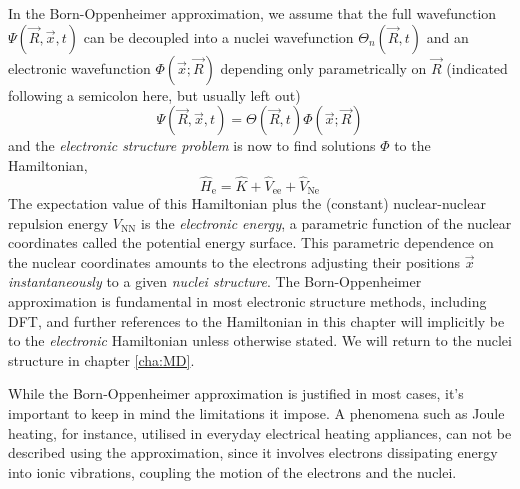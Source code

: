 \documentclass[11pt,bibliography=totoc,index=totoc]{scrbook}   %
\begin{document}


In the Born-Oppenheimer approximation, we assume that the full wavefunction $\Psi(\vec{R},\vec{x},t)$ can be decoupled into 
a nuclei wavefunction $\Theta_n(\vec{R},t)$ and an electronic wavefunction $\Phi(\vec{x};\vec{R})$ depending only parametrically on $\vec{R}$
(indicated following a semicolon here, but usually left out)
\begin{equation}
  \Psi(\vec{R},\vec{x},t) = \Theta(\vec{R},t)\Phi(\vec{x};\vec{R})
\end{equation}
and the \emph{electronic structure problem} is now to find solutions $\Phi$ to the Hamiltonian,
\begin{equation}
    \hat{H}_{\text{e}} = \hat{K} + \hat{V}_{\text{ee}} + \hat{V}_{\text{Ne}}
  \label{eq:el-hamiltonian}
\end{equation}
The expectation value of this Hamiltonian plus the (constant) nuclear-nuclear repulsion energy $V_{\text{NN}}$ is the \emph{electronic energy},\cite[110]{Cramer:2004}
a parametric function of the nuclear coordinates called the potential energy surface.
This parametric dependence on the nuclear coordinates amounts to the electrons adjusting their positions $\vec{x}$ \emph{instantaneously} to a given \emph{nuclei structure}.
The Born-Oppenheimer approximation is fundamental in most electronic structure methods, including DFT, and further references to the Hamiltonian in this chapter will implicitly be to the \emph{electronic} Hamiltonian unless otherwise stated. 
We will return to the nuclei structure in chapter \ref{cha:MD}.

While the Born-Oppenheimer approximation is justified in most cases,\cite[p. 111]{Cramer:2004} it's important to keep in mind the limitations it impose.
A phenomena such as Joule heating, for instance, utilised in everyday electrical heating appliances, can not be described using the approximation, since it involves electrons dissipating energy into ionic vibrations, coupling the motion of the electrons and the nuclei.\cite{Horsfield:2004b}
\end{document}
